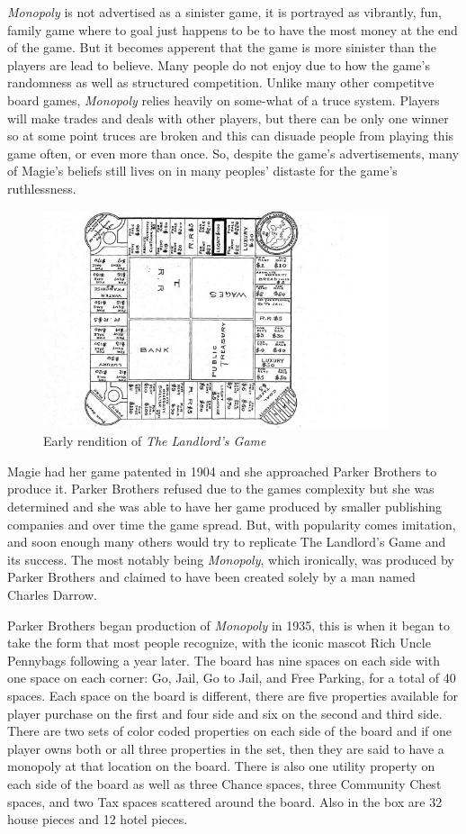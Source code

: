 \documentclass{article}
\begin{document}
\textit{Monopoly} is not advertised as a sinister game, it is portrayed as vibrantly, fun, family game where to goal just happens to be to have the most money at the end of the game.  But it becomes apperent that the game is more sinister than the players are lead to believe.  Many people do not enjoy  due to how the game's randomness as well as structured competition.  Unlike many other competitve board games, \textit{Monopoly} relies heavily on some-what of a truce system.  Players will make trades and deals with other players, but there can be only one winner so at some point truces are broken and this can disuade people from playing this game often, or even more than once.  So, despite the game's advertisements, many of Magie's beliefs still lives on in many peoples' distaste for the game's ruthlessness.


\begin{figure}
    \centering
    \includegraphics[width=4.0in]{landlordsgame}
    \caption{Early rendition of \textit{The Landlord's Game}}
    \label{landlordsgame_image}
\end{figure}


Magie had her game patented in 1904 and she approached Parker Brothers to produce it.  Parker Brothers refused due to the games complexity but she was determined and she was able to have her game produced by smaller publishing companies and over time the game spread. But, with popularity comes imitation, and soon enough many others would try to replicate The Landlord’s Game and its success.  The most notably being \textit{Monopoly}, which ironically, was produced by Parker Brothers and claimed to have been created solely by a man named Charles Darrow.

Parker Brothers began production of \textit{Monopoly} in 1935, this is when it began to take the form that most people recognize, with the iconic mascot Rich Uncle Pennybags following a year later.  The board has nine spaces on each side with one space on each corner: Go, Jail, Go to Jail, and Free Parking, for a total of 40 spaces.  Each space on the board is different, there are five properties available for player purchase on the first and four side and six on the second and third side.  There are two sets of color coded properties on each side of the board and if one player owns both or all three properties in the set, then they are said to have a monopoly at that location on the board.  There is also one utility property on each side of the board as well as three Chance spaces, three Community Chest spaces, and two Tax spaces scattered around the board.  Also in the box are 32 house pieces and 12 hotel pieces.
\end{document}
